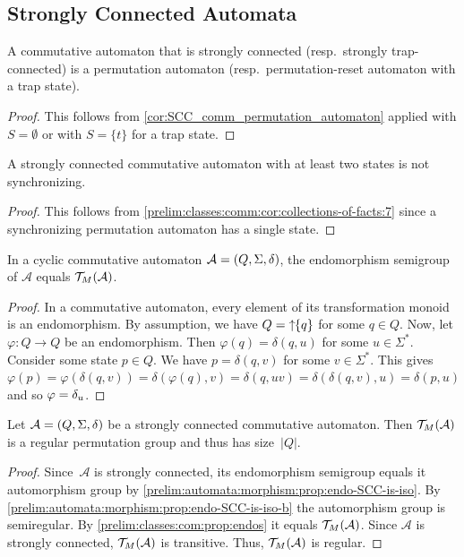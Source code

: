 \subsection{Strongly Connected Automata}
\label{prelim:classes:comm:subsec:SCC}

\begin{proposition} \label{prelim:classes:comm:cor:collections-of-facts:7} 
	A commutative automaton that is strongly connected (resp.~strongly trap-connected)
	is a permutation automaton (resp.~permutation-reset automaton with a trap state). 
\end{proposition}
\begin{proof} 
	This follows from \cref{cor:SCC_comm_permutation_automaton} applied with 
	$S = \emptyset$ or with $S = \{t\}$ for a trap state.
\end{proof} 

\begin{corollary}
	A strongly connected commutative automaton with at least two states is not synchronizing.	
\end{corollary}
\begin{proof}
	This follows from \cref{prelim:classes:comm:cor:collections-of-facts:7} 
	since a synchronizing permutation automaton has a single state.
\end{proof}

\begin{proposition} \label{prelim:classes:com:prop:endos}
	In a cyclic commutative automaton $\mathcal A = (Q, \Sigma, \delta)$,
	the endomorphism semigroup of $\mathcal A$ equals
	$\mathcal T_M(\mathcal A)$.
\end{proposition}
\begin{proof}
	In a commutative automaton, every element of its transformation monoid
	is an endomorphism.
	By assumption, we have $Q = \mbox{\ensuremath{\displaystyle \uparrow \!\!\{q\}}}$ for some $q \in Q$.
	Now, let $\varphi \colon Q \to Q$ be an endomorphism.
	Then $\varphi(q) = \delta(q, u)$ for some $u \in \Sigma^*$.
	Consider some state $p \in Q$. We have $p = \delta(q, v)$
	for some $v \in \Sigma^*$.
	This gives $\varphi(p) = \varphi(\delta(q, v)) = \delta(\varphi(q), v) = \delta(q, uv) = \delta(\delta(q, v), u) = \delta(p, u)$
	and so $\varphi = {\delta}_{u}$.
\end{proof}

\begin{corollary} \label{prelim:classes:comm:prop:permSCC-regular}
	Let $\mathcal A = (Q, \Sigma, \delta)$ be a strongly connected commutative automaton.
	Then $\mathcal T_M(\mathcal A)$ is a regular permutation group and thus has size~$|Q|$.
\end{corollary}
\begin{proof}
	Since~$\mathcal A$ is strongly connected,
	its endomorphism semigroup
	equals it automorphism group by	\cref{prelim:automata:morphism:prop:endo-SCC-is-iso}.
	By \cref{prelim:automata:morphism:prop:endo-SCC-is-iso-b}
	the automorphism group is semiregular.
	By \cref{prelim:classes:com:prop:endos} 
	it equals $\mathcal T_M(\mathcal A)$.
	Since $\mathcal A$ is strongly connected, $\mathcal T_M(\mathcal A)$
	is transitive. Thus, $\mathcal T_M(\mathcal A)$ is regular. 
\end{proof}

